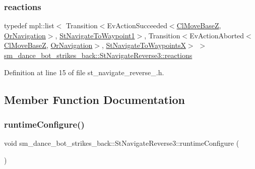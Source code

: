 \subsubsection{\texorpdfstring{reactions}{reactions}}
{\footnotesize\ttfamily typedef mpl\+::list$<$ Transition$<$Ev\+Action\+Succeeded$<$\hyperlink{classmove__base__z__client_1_1ClMoveBaseZ}{Cl\+Move\+BaseZ}, \hyperlink{classsm__dance__bot__strikes__back_1_1OrNavigation}{Or\+Navigation}$>$, \hyperlink{structsm__dance__bot__strikes__back_1_1StNavigateToWaypoint1}{St\+Navigate\+To\+Waypoint1}$>$, Transition$<$Ev\+Action\+Aborted$<$\hyperlink{classmove__base__z__client_1_1ClMoveBaseZ}{Cl\+Move\+BaseZ}, \hyperlink{classsm__dance__bot__strikes__back_1_1OrNavigation}{Or\+Navigation}$>$, \hyperlink{structsm__dance__bot__strikes__back_1_1StNavigateToWaypointsX}{St\+Navigate\+To\+WaypointsX}$>$ $>$ \hyperlink{structsm__dance__bot__strikes__back_1_1StNavigateReverse3_a5c1180a82dc742066f74de9218d14b4e}{sm\+\_\+dance\+\_\+bot\+\_\+strikes\+\_\+back\+::\+St\+Navigate\+Reverse3\+::reactions}}



Definition at line 15 of file st\+\_\+navigate\+\_\+reverse\+\_.\+h.



\subsection{Member Function Documentation}
\mbox{\label{structsm__dance__bot__strikes__back_1_1StNavigateReverse3_a2b8eef6f3186b5bddef66e944be5f68a}} 
\subsubsection{\texorpdfstring{runtime\+Configure()}{runtimeConfigure()}}
{\footnotesize\ttfamily void sm\+\_\+dance\+\_\+bot\+\_\+strikes\+\_\+back\+::\+St\+Navigate\+Reverse3\+::runtime\+Configure (\begin{DoxyParamCaption}{ }\end{DoxyParamCaption})\hspace{0.3cm}{\ttfamily [inline]}}



